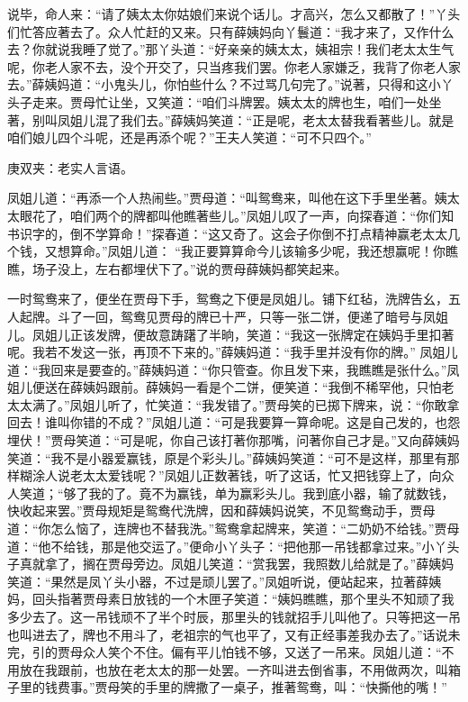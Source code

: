 \begin{parag}
    说毕，命人来：“请了姨太太你姑娘们来说个话儿。才高兴，怎么又都散了！”丫头们忙答应著去了。众人忙赶的又来。只有薛姨妈向丫鬟道：“我才来了，又作什么去？你就说我睡了觉了。”那丫头道：“好亲亲的姨太太，姨祖宗！我们老太太生气呢，你老人家不去，没个开交了，只当疼我们罢。你老人家嫌乏，我背了你老人家去。”薛姨妈道：“小鬼头儿，你怕些什么？不过骂几句完了。”说著，只得和这小丫头子走来。贾母忙让坐，又笑道：“咱们斗牌罢。姨太太的牌也生，咱们一处坐著，别叫凤姐儿混了我们去。”薛姨妈笑道：“正是呢，老太太替我看著些儿。就是咱们娘儿四个斗呢，还是再添个呢？”王夫人笑道：“可不只四个。”\begin{note}庚双夹：老实人言语。\end{note}凤姐儿道：“再添一个人热闹些。”贾母道：“叫鸳鸯来，叫他在这下手里坐著。姨太太眼花了，咱们两个的牌都叫他瞧著些儿。”凤姐儿叹了一声，向探春道：“你们知书识字的，倒不学算命！”探春道：“这又奇了。这会子你倒不打点精神赢老太太几个钱，又想算命。”凤姐儿道： “我正要算算命今儿该输多少呢，我还想赢呢！你瞧瞧，场子没上，左右都埋伏下了。”说的贾母薛姨妈都笑起来。
\end{parag}


\begin{parag}
    一时鸳鸯来了，便坐在贾母下手，鸳鸯之下便是凤姐儿。铺下红毡，洗牌告幺，五人起牌。斗了一回，鸳鸯见贾母的牌已十严，只等一张二饼，便递了暗号与凤姐儿。凤姐儿正该发牌，便故意踌躇了半晌，笑道：“我这一张牌定在姨妈手里扣著呢。我若不发这一张，再顶不下来的。”薛姨妈道：“我手里并没有你的牌。” 凤姐儿道：“我回来是要查的。”薛姨妈道：“你只管查。你且发下来，我瞧瞧是张什么。”凤姐儿便送在薛姨妈跟前。薛姨妈一看是个二饼，便笑道：“我倒不稀罕他，只怕老太太满了。”凤姐儿听了，忙笑道：“我发错了。”贾母笑的已掷下牌来，说：“你敢拿回去！谁叫你错的不成？”凤姐儿道：“可是我要算一算命呢。这是自己发的，也怨埋伏！”贾母笑道：“可是呢，你自己该打著你那嘴，问著你自己才是。”又向薛姨妈笑道：“我不是小器爱赢钱，原是个彩头儿。”薛姨妈笑道：“可不是这样，那里有那样糊涂人说老太太爱钱呢？”凤姐儿正数著钱，听了这话，忙又把钱穿上了，向众人笑道；“够了我的了。竟不为赢钱，单为赢彩头儿。我到底小器，输了就数钱，快收起来罢。”贾母规矩是鸳鸯代洗牌，因和薛姨妈说笑，不见鸳鸯动手，贾母道：“你怎么恼了，连牌也不替我洗。”鸳鸯拿起牌来，笑道：“二奶奶不给钱。”贾母道：“他不给钱，那是他交运了。”便命小丫头子：“把他那一吊钱都拿过来。”小丫头子真就拿了，搁在贾母旁边。凤姐儿笑道：“赏我罢，我照数儿给就是了。”薛姨妈笑道：“果然是凤丫头小器，不过是顽儿罢了。”凤姐听说，便站起来，拉著薛姨妈，回头指著贾母素日放钱的一个木匣子笑道：“姨妈瞧瞧，那个里头不知顽了我多少去了。这一吊钱顽不了半个时辰，那里头的钱就招手儿叫他了。只等把这一吊也叫进去了，牌也不用斗了，老祖宗的气也平了，又有正经事差我办去了。”话说未完，引的贾母众人笑个不住。偏有平儿怕钱不够，又送了一吊来。凤姐儿道：“不用放在我跟前，也放在老太太的那一处罢。一齐叫进去倒省事，不用做两次，叫箱子里的钱费事。”贾母笑的手里的牌撒了一桌子，推著鸳鸯，叫：“快撕他的嘴！”
\end{parag}


